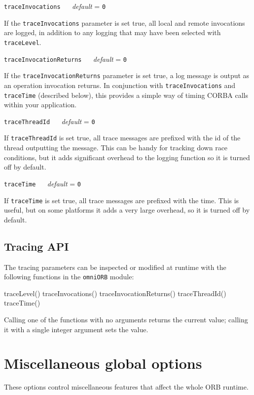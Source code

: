 \documentclass[11pt,twoside,a4paper]{book}
\makeatletter
\newcommand{\code}[1]{\texttt{#1}}
\newcommand{\confopt}[2]
  {\vspace{\baselineskip}\par\noindent\code{#1} ~~ \textit{default} =
   \code{#2}}
\renewcommand{\confopt}[2]
  {\vspace{\baselineskip}\par\noindent\code{#1} ~~ \textit{default} =
   \code{#2}\\[-1ex]\@afterheading}
\makeatother
\begin{document}
\confopt{traceInvocations}{0}

If the \code{traceInvocations} parameter is set true, all local and
remote invocations are logged, in addition to any logging that may
have been selected with \code{traceLevel}.


\confopt{traceInvocationReturns}{0}

If the \code{traceInvocationReturns} parameter is set true, a log
message is output as an operation invocation returns. In conjunction
with \code{traceInvocations} and \code{traceTime} (described below),
this provides a simple way of timing CORBA calls within your
application.


\confopt{traceThreadId}{0}

If \code{traceThreadId} is set true, all trace messages are prefixed
with the id of the thread outputting the message. This can be handy
for tracking down race conditions, but it adds significant overhead to
the logging function so it is turned off by default.


\confopt{traceTime}{0}

If \code{traceTime} is set true, all trace messages are prefixed with
the time. This is useful, but on some platforms it adds a very large
overhead, so it is turned off by default.



\subsection{Tracing API}

The tracing parameters can be inspected or modified at runtime with
the following functions in the \code{omniORB} module:

\begin{pylisting}
  traceLevel()
  traceInvocations()
  traceInvocationReturns()
  traceThreadId()
  traceTime()
\end{pylisting}

\noindent
Calling one of the functions with no arguments returns the current
value; calling it with a single integer argument sets the value.



\section{Miscellaneous global options}

These options control miscellaneous features that affect the whole ORB
runtime.
\end{document}
